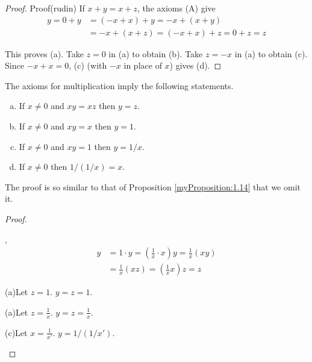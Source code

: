\begin{proof}
    Proof(rudin)
    If $x + y =x + z$, the axioms (A) give
    \begin{align*}
        y =0+y&=(-x+x)+y=-x+(x+y)\\
        &=-x+(x+z)=(-x+x)+z=0+z=z
    \end{align*}

    This proves (a). Take $z = 0$ in (a) to obtain (b). 
    Take $z= -x$ in (a) to obtain (c).
    Since $-x + x = 0$, (c) (with $-x$ in place of $x$) gives (d).
\end{proof}


\begin{myProposition}
    \label{Proposition:1.15}
    The axioms for multiplication imply the following statements.
    \begin{enumerate}[(a)]
        \item If $x\neq0$ and $xy=xz$ then $y=z$.
        \item If $x\neq0$ and $xy=x$ then $y=1$.
        \item If $x\neq0$ and $xy=1$ then $y=1/x$.
        \item If $x\neq0$ then $1/(1/x) = x$.
    \end{enumerate}
\end{myProposition}

The proof is so similar to that of Proposition \ref{myProposition:1.14} that we omit it.


\begin{proof}
    \begin{asparaenum}[(a)]
        \item ,
        \begin{align*}
            y&=1\cdot y=\left(\frac{1}{x}\cdot x\right)y =\frac{1}{x}\left( xy \right)\\
            &=\frac{1}{x}(xz) =\left(\frac{1}{x}x\right)z = z
        \end{align*}
        \item (a)Let $z=1$. $y=z=1$.
        \item (a)Let $z=\frac{1}{x}$. $y=z=\frac{1}{x}$.
        \item (c)Let $x=\frac{1}{x'}$. $y=1/(1/x')$.
    \end{asparaenum}
\end{proof}


